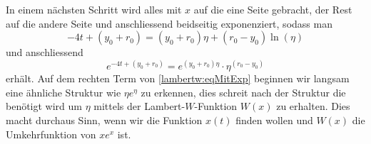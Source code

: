 In einem nächsten Schritt wird alles mit \(x\) auf die eine Seite gebracht, der Rest auf die andere Seite und anschliessend beidseitig exponenziert, sodass man 
\begin{equation}
	-4t+\left(y_0+r_0\right)
	=
	\left(y_0+r_0\right)\eta+\left(r_0-y_0\right)\operatorname{ln}\left(\eta\right)
\end{equation}
und anschliessend
\begin{equation}
	e^{\displaystyle -4t+\left(y_0+r_0\right)}
	=
	e^{\displaystyle \left(y_0+r_0\right)\eta}\cdot\eta^{\displaystyle \left(r_0-y_0\right)}
	\label{lambertw:eqMitExp}
\end{equation}
erhält.
Auf dem rechten Term von \eqref{lambertw:eqMitExp} beginnen wir langsam eine ähnliche Struktur wie \(\eta e^\eta\) zu erkennen, dies schreit nach der Struktur die benötigt wird um \(\eta\) mittels der Lambert-\(W\)-Funktion \(W(x)\) zu erhalten. Dies macht durchaus Sinn, wenn wir die Funktion \(x(t)\) finden wollen und \(W(x)\) die Umkehrfunktion von \(x e^x\) ist. 

